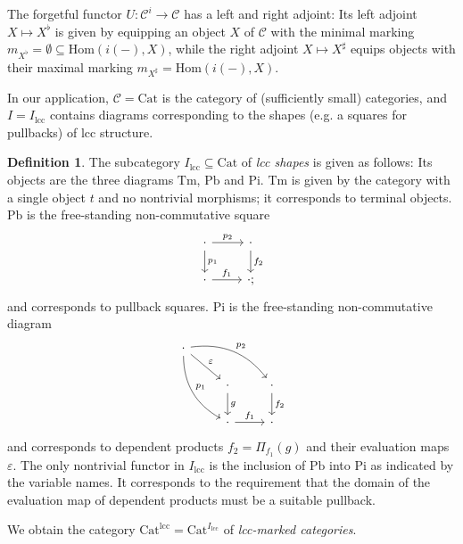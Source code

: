 \documentclass[a4paper]{article}
\theoremstyle{remark}
\theoremstyle{definition}
\newtheorem{definition}[theorem]{Definition}
\begin{document}
The forgetful functor $U : \mathcal{C}^i \rightarrow \mathcal{C}$ has a left and right adjoint:
Its left adjoint $X \mapsto X^\flat$ is given by equipping an object $X$ of $\mathcal{C}$ with the minimal marking $m_{X^\flat} = \emptyset \subseteq \mathrm{Hom}(i(-), X)$, while the right adjoint $X \mapsto X^\sharp$ equips objects with their maximal marking $m_{X^\sharp} = \mathrm{Hom}(i(-), X)$.

In our application, $\mathcal{C} = \mathrm{Cat}$ is the category of (sufficiently small) categories, and $I = I_\mathrm{lcc}$ contains diagrams corresponding to the shapes (e.g. a squares for pullbacks) of lcc structure.

\begin{definition}
  The subcategory $I_\mathrm{lcc} \subseteq \mathrm{Cat}$ of \emph{lcc shapes} is given as follows:
  Its objects are the three diagrams $\mathrm{Tm}$, $\mathrm{Pb}$ and $\mathrm{Pi}$.
  $\mathrm{Tm}$ is given by the category with a single object $t$ and no nontrivial morphisms; it corresponds to terminal objects.
  $\mathrm{Pb}$ is the free-standing non-commutative square
  \begin{equation}
    \begin{tikzcd}
      \cdot \arrow[d, "p_1"] \arrow[r, "p_2"] & \cdot \arrow[d, "f_2"] \\
      \cdot \arrow[r, "f_1"] & \cdot;
    \end{tikzcd}
  \end{equation}
  and corresponds to pullback squares.
  $\mathrm{Pi}$ is the free-standing non-commutative diagram
  \begin{equation}
    \begin{tikzcd}
      \cdot \arrow[ddr, bend right, "p_1"] \arrow[drr, bend left, "p_2"] \arrow[dr, "\varepsilon"] \\
      & \cdot \arrow[d, "g"] & \cdot \arrow[d, "f_2"] \\
      & \cdot \arrow[r, "f_1"] & \cdot
    \end{tikzcd}
  \end{equation}
  and corresponds to dependent products $f_2 = \Pi_{f_1}(g)$ and their evaluation maps $\varepsilon$.
  The only nontrivial functor in $I_\mathrm{lcc}$ is the inclusion of $\mathrm{Pb}$ into $\mathrm{Pi}$ as indicated by the variable names.
  It corresponds to the requirement that the domain of the evaluation map of dependent products must be a suitable pullback.

  We obtain the category $\mathrm{Cat}^\mathrm{lcc} = \mathrm{Cat}^{I_\mathrm{lcc}}$ of \emph{lcc-marked categories}.
\end{definition}
\end{document}
